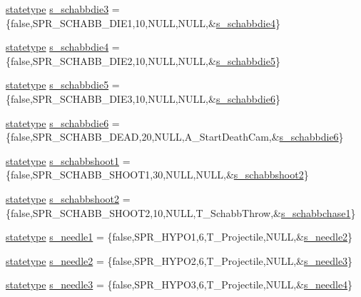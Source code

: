 \begin{DoxyCompactItemize}
\item 
\hyperlink{structstatestruct}{statetype} \hyperlink{WL__ACT2_8C_aff88f82fca52e5165b0754c76bca3d92}{s\_\-schabbdie3} = \{false,SPR\_\-SCHABB\_\-DIE1,10,NULL,NULL,\&\hyperlink{WL__ACT2_8C_a0264665a73e503feeb4394daeaf1f725}{s\_\-schabbdie4}\}
\item 
\hyperlink{structstatestruct}{statetype} \hyperlink{WL__ACT2_8C_a0264665a73e503feeb4394daeaf1f725}{s\_\-schabbdie4} = \{false,SPR\_\-SCHABB\_\-DIE2,10,NULL,NULL,\&\hyperlink{WL__ACT2_8C_abd5a4ffcf29513a1761f11307531073b}{s\_\-schabbdie5}\}
\item 
\hyperlink{structstatestruct}{statetype} \hyperlink{WL__ACT2_8C_abd5a4ffcf29513a1761f11307531073b}{s\_\-schabbdie5} = \{false,SPR\_\-SCHABB\_\-DIE3,10,NULL,NULL,\&\hyperlink{WL__ACT2_8C_aaaeeadbf796f6d04b81b59c0095fc584}{s\_\-schabbdie6}\}
\item 
\hyperlink{structstatestruct}{statetype} \hyperlink{WL__ACT2_8C_aaaeeadbf796f6d04b81b59c0095fc584}{s\_\-schabbdie6} = \{false,SPR\_\-SCHABB\_\-DEAD,20,NULL,A\_\-StartDeathCam,\&\hyperlink{WL__ACT2_8C_aaaeeadbf796f6d04b81b59c0095fc584}{s\_\-schabbdie6}\}
\item 
\hyperlink{structstatestruct}{statetype} \hyperlink{WL__ACT2_8C_ab2279415dbaa1c3d37bf891db55fa894}{s\_\-schabbshoot1} = \{false,SPR\_\-SCHABB\_\-SHOOT1,30,NULL,NULL,\&\hyperlink{WL__ACT2_8C_ad8ae8bf714597c5548b31aea767637cc}{s\_\-schabbshoot2}\}
\item 
\hyperlink{structstatestruct}{statetype} \hyperlink{WL__ACT2_8C_ad8ae8bf714597c5548b31aea767637cc}{s\_\-schabbshoot2} = \{false,SPR\_\-SCHABB\_\-SHOOT2,10,NULL,T\_\-SchabbThrow,\&\hyperlink{WL__DEF_8H_aec6fd3f192ea893821d9f9707bcc714a}{s\_\-schabbchase1}\}
\item 
\hyperlink{structstatestruct}{statetype} \hyperlink{WL__ACT2_8C_a8bbf1638f0ed9842b39a992ee4e0f5b4}{s\_\-needle1} = \{false,SPR\_\-HYPO1,6,T\_\-Projectile,NULL,\&\hyperlink{WL__ACT2_8C_abdffd4a4b451d90a8547c8cbf2c592cd}{s\_\-needle2}\}
\item 
\hyperlink{structstatestruct}{statetype} \hyperlink{WL__ACT2_8C_abdffd4a4b451d90a8547c8cbf2c592cd}{s\_\-needle2} = \{false,SPR\_\-HYPO2,6,T\_\-Projectile,NULL,\&\hyperlink{WL__ACT2_8C_a91077e051a1c5b8bdcd3a13bd34bf412}{s\_\-needle3}\}
\item 
\hyperlink{structstatestruct}{statetype} \hyperlink{WL__ACT2_8C_a91077e051a1c5b8bdcd3a13bd34bf412}{s\_\-needle3} = \{false,SPR\_\-HYPO3,6,T\_\-Projectile,NULL,\&\hyperlink{WL__ACT2_8C_a18e9f19ac3118dad31a26cc1bc958c6a}{s\_\-needle4}\}

\end{DoxyCompactItemize}
